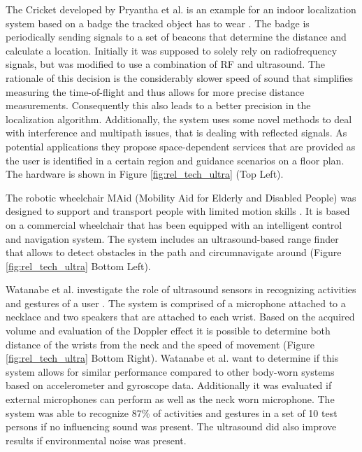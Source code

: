 The Cricket developed by Pryantha et al. is an example for an indoor localization system based on a badge the tracked object has to wear \cite{priyantha2000cricket}. The badge is periodically sending signals to a set of beacons that determine the distance and calculate a location. Initially it was supposed to solely rely on radiofrequency signals, but was modified to use a combination of RF and ultrasound. The rationale of this decision is the considerably slower speed of sound that simplifies measuring the time-of-flight and thus allows for more precise distance measurements. Consequently this also leads to a better precision in the localization algorithm. Additionally, the system uses some novel methods to deal with interference and multipath issues, that is dealing with reflected signals. As potential applications they propose space-dependent services that are provided as the user is identified in a certain region and guidance scenarios on a floor plan. The hardware is shown in Figure \ref{fig:rel_tech_ultra} (Top Left).

The robotic wheelchair MAid (Mobility Aid for Elderly and Disabled People) was designed to support and transport people with limited motion skills \cite{prassler2001robotics}. It is based on a commercial wheelchair that has been equipped with an intelligent control and navigation system. The system includes an ultrasound-based range finder that allows to detect obstacles in the path and circumnavigate around (Figure \ref{fig:rel_tech_ultra} Bottom Left). 

Watanabe et al. investigate the role of ultrasound sensors in recognizing activities and gestures of a user \cite{watanabe2013ultrasound}. The system is comprised of a microphone attached to a necklace and two speakers that are attached to each wrist. Based on the acquired volume and evaluation of the Doppler effect it is possible to determine both distance of the wrists from the neck and the speed of movement (Figure \ref{fig:rel_tech_ultra} Bottom Right). Watanabe et al. want to determine if this system allows for similar performance compared to other body-worn systems based on accelerometer and gyroscope data. Additionally it was evaluated if external microphones can perform as well as the neck worn microphone. The system was able to recognize 87\% of activities and gestures in a set of 10 test persons if no influencing sound was present. The ultrasound did also improve results if environmental noise was present.

